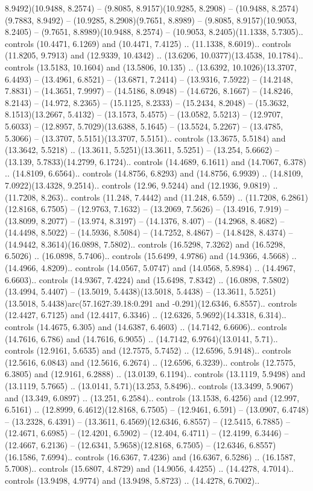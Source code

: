 8.9492)(10.9488, 8.2574) -- (9.8085, 8.9157)(10.9285, 8.2908) -- (10.9488, 8.2574)(9.7883, 8.9492) -- (10.9285, 8.2908)(9.7651, 8.8989) -- (9.8085, 8.9157)(10.9053, 8.2405) -- (9.7651, 8.8989)(10.9488, 8.2574) -- (10.9053, 8.2405)(11.1338, 5.7305).. controls (10.4471, 6.1269) and (10.4471, 7.4125) .. (11.1338, 8.6019).. controls (11.8205, 9.7913) and (12.9339, 10.4342) .. (13.6206, 10.0377)(13.4538, 10.1784).. controls (13.5183, 10.1604) and (13.5806, 10.135) .. (13.6392, 10.1026)(13.3707, 6.4493) -- (13.4961, 6.8521) -- (13.6871, 7.2414) -- (13.9316, 7.5922) -- (14.2148, 7.8831) -- (14.3651, 7.9997) -- (14.5186, 8.0948) -- (14.6726, 8.1667) -- (14.8246, 8.2143) -- (14.972, 8.2365) -- (15.1125, 8.2333) -- (15.2434, 8.2048) -- (15.3632, 8.1513)(13.2667, 5.4132) -- (13.1573, 5.4575) -- (13.0582, 5.5213) -- (12.9707, 5.6033) -- (12.8957, 5.7029)(13.6388, 5.1645) -- (13.5524, 5.2267) -- (13.4785, 5.3066) -- (13.3707, 5.5151)(13.3707, 5.5151).. controls (13.3675, 5.5184) and (13.3642, 5.5218) .. (13.3611, 5.5251)(13.3611, 5.5251) -- (13.254, 5.6662) -- (13.139, 5.7833)(14.2799, 6.1724).. controls (14.4689, 6.1611) and (14.7067, 6.378) .. (14.8109, 6.6564).. controls (14.8756, 6.8293) and (14.8756, 6.9939) .. (14.8109, 7.0922)(13.4328, 9.2514).. controls (12.96, 9.5244) and (12.1936, 9.0819) .. (11.7208, 8.263).. controls (11.248, 7.4442) and (11.248, 6.559) .. (11.7208, 6.2861)(12.8168, 6.7505) -- (12.9763, 7.1632) -- (13.2069, 7.5626) -- (13.4916, 7.919) -- (13.8099, 8.2077) -- (13.974, 8.3197) -- (14.1376, 8.407) -- (14.2968, 8.4682) -- (14.4498, 8.5022) -- (14.5936, 8.5084) -- (14.7252, 8.4867) -- (14.8428, 8.4374) -- (14.9442, 8.3614)(16.0898, 7.5802).. controls (16.5298, 7.3262) and (16.5298, 6.5026) .. (16.0898, 5.7406).. controls (15.6499, 4.9786) and (14.9366, 4.5668) .. (14.4966, 4.8209).. controls (14.0567, 5.0747) and (14.0568, 5.8984) .. (14.4967, 6.6603).. controls (14.9367, 7.4224) and (15.6498, 7.8342) .. (16.0898, 7.5802)(13.4994, 5.4407) -- (13.5019, 5.4438)(13.5018, 5.4438) -- (13.3611, 5.5251)(13.5018, 5.4438)arc(57.1627:39.18:0.291 and -0.291)(12.6346, 6.8557).. controls (12.4427, 6.7125) and (12.4417, 6.3346) .. (12.6326, 5.9692)(14.3318, 6.314).. controls (14.4675, 6.305) and (14.6387, 6.4603) .. (14.7142, 6.6606).. controls (14.7616, 6.786) and (14.7616, 6.9055) .. (14.7142, 6.9764)(13.0141, 5.71).. controls (12.9161, 5.6535) and (12.7575, 5.7452) .. (12.6596, 5.9148).. controls (12.5616, 6.0843) and (12.5616, 6.2674) .. (12.6596, 6.3239).. controls (12.7575, 6.3805) and (12.9161, 6.2888) .. (13.0139, 6.1194).. controls (13.1119, 5.9498) and (13.1119, 5.7665) .. (13.0141, 5.71)(13.253, 5.8496).. controls (13.3499, 5.9067) and (13.349, 6.0897) .. (13.251, 6.2584).. controls (13.1538, 6.4256) and (12.997, 6.5161) .. (12.8999, 6.4612)(12.8168, 6.7505) -- (12.9461, 6.591) -- (13.0907, 6.4748) -- (13.2328, 6.4391) -- (13.3611, 6.4569)(12.6346, 6.8557) -- (12.5415, 6.7885) -- (12.4671, 6.6985) -- (12.4201, 6.5902) -- (12.404, 6.4711) -- (12.4199, 6.3446) -- (12.4667, 6.2136) -- (12.6341, 5.9658)(12.8168, 6.7505) -- (12.6346, 6.8557)(16.1586, 7.6994).. controls (16.6367, 7.4236) and (16.6367, 6.5286) .. (16.1587, 5.7008).. controls (15.6807, 4.8729) and (14.9056, 4.4255) .. (14.4278, 4.7014).. controls (13.9498, 4.9774) and (13.9498, 5.8723) .. (14.4278, 6.7002).. 